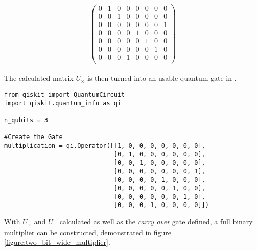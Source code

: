 \begin{equation}
\begin{split}
\begin{pmatrix}
         0 & 1 & 0 & 0 & 0 & 0 & 0 & 0\\
         0 & 0 & 1 & 0 & 0 & 0 & 0 & 0\\
         0 & 0 & 0 & 0 & 0 & 0 & 0 & 1\\
         0 & 0 & 0 & 0 & 1 & 0 & 0 & 0\\
         0 & 0 & 0 & 0 & 0 & 1 & 0 & 0\\
         0 & 0 & 0 & 0 & 0 & 0 & 1 & 0\\
         0 & 0 & 0 & 1 & 0 & 0 & 0 & 0\\
         \end{pmatrix}
    \end{split}
    \label{equation:multiplication_matrix_solved}
\end{equation}

\newpage
The calculated matrix $U_{\times}$ is then turned into an usable quantum gate in .

\begin{verbatim}
from qiskit import QuantumCircuit
import qiskit.quantum_info as qi

n_qubits = 3

#Create the Gate
multiplication = qi.Operator([[1, 0, 0, 0, 0, 0, 0, 0],
                              [0, 1, 0, 0, 0, 0, 0, 0],
                              [0, 0, 1, 0, 0, 0, 0, 0],
                              [0, 0, 0, 0, 0, 0, 0, 1],
                              [0, 0, 0, 0, 1, 0, 0, 0],
                              [0, 0, 0, 0, 0, 1, 0, 0],
                              [0, 0, 0, 0, 0, 0, 1, 0],
                              [0, 0, 0, 1, 0, 0, 0, 0]])
\end{verbatim}

With $U_{\times}$ and $U_{+}$ calculated as well as the \emph{carry over} gate defined, a full binary multiplier can be constructed, demonstrated in figure \ref{figure:two_bit_wide_multiplier}.

